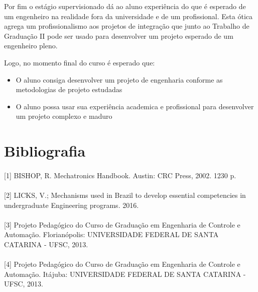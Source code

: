 \documentclass[12pt]{article} %
\begin{document}
Por fim o estágio supervisionado dá ao aluno experiência do que é esperado de um engenheiro na realidade fora da universidade e de um profissional. Esta ótica agrega um profissionalismo aos projetos de integração que junto ao Trabalho de Graduação II pode ser usado para desenvolver um projeto esperado de um engenheiro pleno.

Logo, no momento final do curso é esperado que:

\begin{itemize}
\item O aluno consiga desenvolver um projeto de engenharia conforme as metodologias de projeto estudadas
\item O aluno possa usar sua experiência academica e profissional para desenvolver um projeto complexo e maduro
\end{itemize}


\section{Bibliografia}

\paragraph{}


[1] BISHOP, R. Mechatronics Handbook. Austin: CRC Press, 2002. 1230 p.

\paragraph{}

[2] LICKS, V.; Mechanisms used in Brazil to develop essential competencies in undergraduate Engineering programs. 2016.

\paragraph{}

[3] Projeto Pedagógico do Curso de Graduação em Engenharia de Controle e Automação. Florianópolis: UNIVERSIDADE FEDERAL DE SANTA CATARINA - UFSC, 2013.

\paragraph{}

[4] Projeto Pedagógico do Curso de Graduação em Engenharia de Controle e Automação. Itájuba: UNIVERSIDADE FEDERAL DE SANTA CATARINA - UFSC, 2013.
\end{document}
